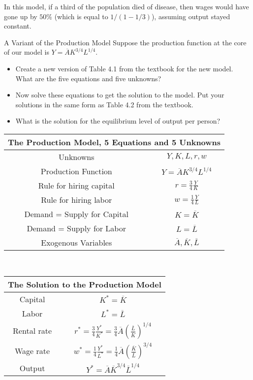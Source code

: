 \documentclass[8pt]{extarticle}
\begin{document}
    \noindent In this model, if a third of the population died of disease, then wages would have gone up by $50\%$ (which is equal to $1/(1-1/3)$), assuming output stayed constant.
\begin{mathbox}{A Variant of the Production Model}
    Suppose the production function at the core of our model is $Y = \overline{A}K^{3/4}L^{1/4}$.
      \begin{itemize}
        \item Create a new version of Table 4.1 from the textbook for the new model. What are the five equations and five unknowns?
        \item Now solve these equations to get the solution to the model. Put your solutions in the same form as Table 4.2 from the textbook.
        \item What is the solution for the equilibrium level of output per person?
      \end{itemize}
  \end{mathbox}
    \begin{center}
      \renewcommand{\arraystretch}{1.5}
      \begin{tabular}{c|c}
        \multicolumn{2}{c}{The Production Model, 5 Equations and 5 Unknowns} \\
        \hline
        Unknowns & $Y,K,L,r,w$ \\
        Production Function & $Y = \overline{A}K^{3/4}L^{1/4}$ \\
        Rule for hiring capital & $r = \frac{3}{4}\frac{Y}{K}$ \\
        Rule for hiring labor & $w = \frac{1}{4}\frac{Y}{L}$ \\
        Demand = Supply for Capital & $K = \overline{K}$ \\
        Demand = Supply for Labor & $L = \overline{L}$ \\
        Exogenous Variables & $\overline{A},\overline{K},\overline{L}$
      \end{tabular} \\

      \begin{tabular}{c|c}
        \multicolumn{2}{c}{The Solution to the Production Model}\\
        \hline
        Capital & $K^{*} = \overline{K}$\\
        Labor & $L^{*} = \overline{L}$ \\
        Rental rate & $r^{*} = \frac{3}{4}\frac{Y^{*}}{K^{*}} = \frac{3}{4}\overline{A}\left(\frac{\overline{L}}{\overline{K}}\right)^{1/4}$ \\
        Wage rate & $w^{*} = \frac{1}{4}\frac{Y^{*}}{L^{*}} = \frac{1}{4}\overline{A}\left(\frac{\overline{K}}{\overline{L}}\right)^{3/4}$ \\
        Output & $Y^{*} = \overline{A} \overline{K}^{3/4} \overline{L}^{1/4}$
      \end{tabular}
    \end{center}
\end{document}
